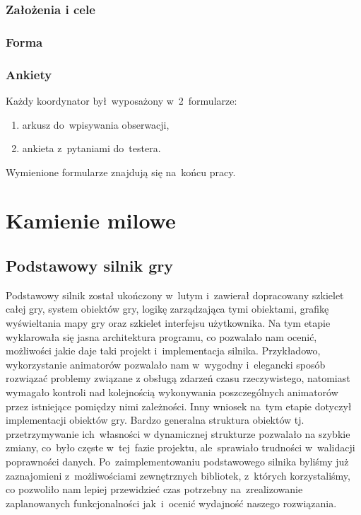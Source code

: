 \documentclass[licencjacka]{pracamgr}
\begin{document}
      \subsection{Założenia i cele}

      \subsection{Forma}

      \subsection{Ankiety}
      Każdy koordynator był~wyposażony w~2~formularze:
      \begin{enumerate}
	\item arkusz do~wpisywania obserwacji,
	\item ankieta z~pytaniami do~testera.
      \end{enumerate}

      \noindent
      Wymienione formularze znajdują się na~końcu pracy.

\chapter{Kamienie milowe}
  \section{Podstawowy silnik gry}
  Podstawowy silnik został ukończony w~lutym i~zawierał dopracowany szkielet całej gry, system obiektów gry,
  logikę zarządzająca tymi obiektami, grafikę wyświeltania mapy gry oraz szkielet interfejsu użytkownika.
  Na tym etapie wyklarowała się jasna architektura programu, co pozwalało nam ocenić, możliwości jakie
  daje taki projekt i~implementacja silnika. Przykładowo, wykorzystanie animatorów pozwalało nam w~wygodny
  i~elegancki sposób rozwiązać problemy związane z obsługą zdarzeń czasu rzeczywistego, natomiast wymagało kontroli
  nad kolejnością wykonywania poszczególnych animatorów przez istniejące pomiędzy nimi zależności. Inny wniosek
  na~tym etapie dotyczył implementacji obiektów gry. Bardzo generalna struktura obiektów tj. przetrzymywanie
  ich~własności w dynamicznej strukturze pozwalało na szybkie zmiany, co~było częste w~tej~fazie projektu,
  ale~sprawiało trudności w~walidacji poprawności danych.
  Po~zaimplementowaniu podstawowego silnika byliśmy już zaznajomieni z~możliwościami zewnętrznych bibliotek,
  z~których korzystaliśmy, co pozwoliło nam lepiej przewidzieć czas potrzebny na~zrealizowanie zaplanowanych
  funkcjonalności jak~i~ocenić wydajność naszego rozwiązania.
\end{document}
